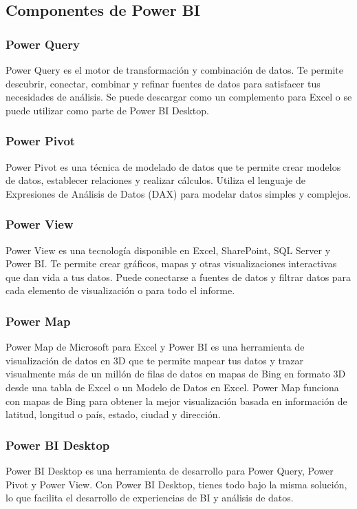 \subsection{Componentes de Power BI}

\subsubsection{Power Query}
Power Query es el motor de transformación y combinación de datos. Te permite descubrir, conectar, 
combinar y refinar fuentes de datos para satisfacer tus necesidades de análisis. Se puede descargar 
como un complemento para Excel o se puede utilizar como parte de Power BI Desktop.

\subsubsection{Power Pivot}
Power Pivot es una técnica de modelado de datos que te permite crear modelos de datos, establecer relaciones 
y realizar cálculos. Utiliza el lenguaje de Expresiones de Análisis de Datos (DAX) para modelar datos simples y complejos.

\subsubsection{Power View}
Power View es una tecnología disponible en Excel, SharePoint, SQL Server y Power BI. Te permite crear gráficos, 
mapas y otras visualizaciones interactivas que dan vida a tus datos. Puede conectarse a fuentes de datos y filtrar 
datos para cada elemento de visualización o para todo el informe.

\subsubsection{Power Map}
Power Map de Microsoft para Excel y Power BI es una herramienta de visualización de datos en 3D que te permite mapear 
tus datos y trazar visualmente más de un millón de filas de datos en mapas de Bing en formato 3D desde una tabla de Excel 
o un Modelo de Datos en Excel. Power Map funciona con mapas de Bing para obtener la mejor visualización basada en información 
de latitud, longitud o país, estado, ciudad y dirección.

\subsubsection{Power BI Desktop}
Power BI Desktop es una herramienta de desarrollo para Power Query, Power Pivot y Power View. Con Power BI Desktop, 
tienes todo bajo la misma solución, lo que facilita el desarrollo de experiencias de BI y análisis de datos.

